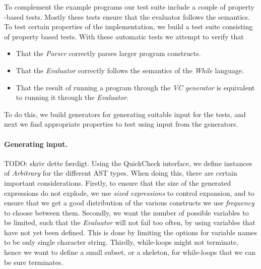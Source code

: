 To complement the example programs our test suite include a couple of property -based tests. Mostly these tests ensure that the evaluator follows the semantics.
To test certain properties of the implementation, we build a test suite consisting of property based tests.
With these automatic tests we attempt to verify that
\begin{itemize}
	\item That the \textit{Parser} correctly parses larger program constructs.
	\item That the \textit{Evaluator} correctly follows the semantics of the \textit{While} language. 
	\item That the result of running a program through the \textit{VC generator} is equivalent to running it through the \textit{Evaluator}.
\end{itemize}
To do this, we build generators for generating suitable input for the tests, and next we find appropriate properties to test using input from the generators.

\paragraph{Generating input.}
TODO: skriv dette færdigt.
Using the QuickCheck interface, we define instances of \textit{Arbitrary} for the different AST types.
When doing this, there are certain important considerations.
Firstly, to ensure that the size of the generated expressions do not explode, we use \textit{sized expressions} to control expansion, and to ensure that we get a good distribution of the various constructs we use \textit{frequency} to choose between them.
Secondly, we want the number of possible variables to be limited, such that the \textit{Evaluator} will not fail too often, by using variables that have not yet been defined. This is done by limiting the options for variable names to be only single character string.
Thirdly, while-loops might not terminate, hence we want to define a small subset, or a skeleton, for while-loops that we can be sure terminates. 


